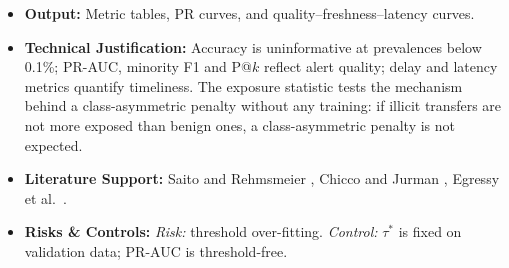 \documentclass[11pt,a4paper]{article}
\begin{document}
\begin{itemize}[leftmargin=*]
\begin{enumerate}[leftmargin=*]
        \item \textit{Intra-unit exposure (model-free):} for each transfer $e$ and granularity $g$, the share of its endpoints' transfers in the preceding 24\,h that fall in the same unit and are therefore invisible to the memory, $\rho_g(e)=|\mathcal{P}_u(e)\cup\mathcal{P}_v(e)|/|\mathcal{H}^{24\text{h}}_u(e)\cup\mathcal{H}^{24\text{h}}_v(e)|$. It is computed from the data alone, by class and typology, before any model is trained.
    \end{enumerate}
    \item \textbf{Output:} Metric tables, PR curves, and quality--freshness--latency curves.
    \item \textbf{Technical Justification:} Accuracy is uninformative at prevalences below 0.1\%; PR-AUC, minority F1 and P@$k$ reflect alert quality; delay and latency metrics quantify timeliness. The exposure statistic tests the mechanism behind a class-asymmetric penalty without any training: if illicit transfers are not more exposed than benign ones, a class-asymmetric penalty is not expected.
    \item \textbf{Literature Support:} Saito and Rehmsmeier \cite{saito2015prroc}, Chicco and Jurman \cite{chicco2020mcc}, Egressy et al.\ \cite{egressy2024multigraph}.
    \item \textbf{Risks \& Controls:} \textit{Risk:} threshold over-fitting. \textit{Control:} $\tau^*$ is fixed on validation data; PR-AUC is threshold-free.
\end{itemize}

\end{document}
